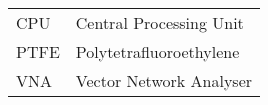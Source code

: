 
\seznamzkr

\begin{tabular}{ll}
CPU & Central Processing Unit \\
PTFE & Polytetrafluoroethylene \\
VNA & Vector Network Analyser \\
\end{tabular}

